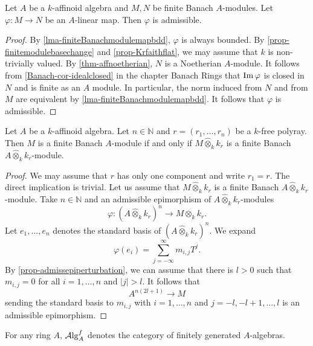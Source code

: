 \begin{proposition}\label{prop-finitemodulemapadmi}
    Let $A$ be a $k$-affinoid algebra and $M,N$ be finite Banach $A$-modules. Let $\varphi:M\rightarrow N$ be an $A$-linear map. Then $\varphi$ is admissible.
\end{proposition}
\begin{proof}
    By \cref{lma-finiteBanachmodulemapbdd}, $\varphi$ is always bounded.
    By \cref{prop-finitemodulebasechange} and \cref{prop-Krfaithflat}, we may assume that $k$ is non-trivially valued. By \cref{thm-affnoetherian}, $N$ is a Noetherian $A$-module. It follows from \cref{Banach-cor-idealclosed} in the chapter Banach Rings that $\operatorname{Im} \varphi$ is closed in $N$ and is finite as an $A$ module. In particular, the norm induced from $N$ and from $M$ are equivalent by \cref{lma-finiteBanachmodulemapbdd}. It follows that $\varphi$ is admissible.
\end{proof}

\begin{proposition}
    Let $A$ be a $k$-affinoid algebra. Let $n\in \mathbb{N}$ and $r=(r_1,\ldots,r_n)$ be a $k$-free polyray. Then $M$ is a finite Banach $A$-module if and only if $M\hat{\otimes}_k k_r$ is a finite Banach $A\hat{\otimes}_k k_r$-module.
\end{proposition}
\begin{proof}
    We may assume that $r$ has only one component and write $r_1=r$. The direct implication is trivial. Let us assume that $M\hat{\otimes}_k k_r$ is a finite Banach $A\hat{\otimes}_k k_r$-module. Take $n\in \mathbb{N}$ and an admissible epimorphism of $A\hat{\otimes}_k k_r$-modules
    \[
        \varphi:  (A\hat{\otimes}_k k_r)^n\rightarrow M\hat{\otimes}_k k_r.
    \]
    Let $e_1,\ldots,e_n$ denotes the standard basis of $(A\hat{\otimes}_k k_r)^n$. We expand
    \[
        \varphi(e_i)=\sum_{j=-\infty}^{\infty} m_{i,j}T^j.  
    \]
    By \cref{prop-admissepiperturbation}, we can assume that there is $l>0$ such that $m_{i,j}=0$ for all $i=1,\ldots,n$ and $|j|>l$. It follows that 
    \[
        A^{n(2l+1)}\rightarrow M  
    \]
    sending the standard basis to $m_{i,j}$ with $i=1,\ldots,n$ and $j=-l,-l+1,\ldots,l$ is an admissible epimorphism.
\end{proof}

For any ring $A$, $\mathcal{A}\mathrm{lg}_A^f$ denotes the category of finitely generated $A$-algebras.

